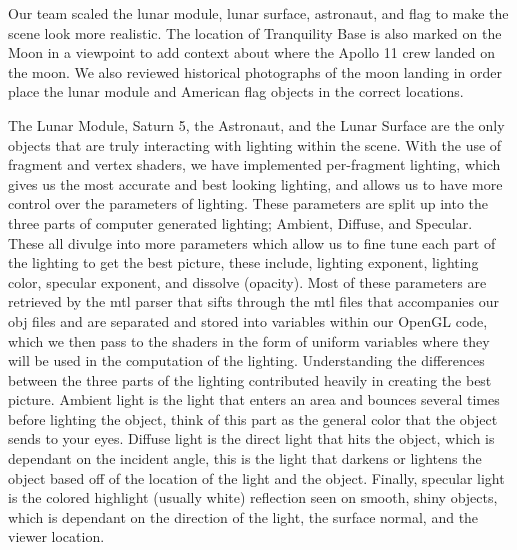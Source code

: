\documentclass[onecolumn, draftclsnofoot,10pt, compsoc]{IEEEtran}
\begin{document}
Our team scaled the lunar module, lunar surface, astronaut, and flag to make the scene look more realistic. The location of Tranquility Base is also marked on the Moon in a viewpoint to add context about where the Apollo 11 crew landed on the moon. We also reviewed historical photographs of the moon landing in order place the lunar module and American flag objects in the correct locations.

The Lunar Module, Saturn 5, the Astronaut, and the Lunar Surface are the only objects that are truly interacting with lighting within the scene. With the use of fragment and vertex shaders, we have implemented per-fragment lighting, which gives us the most accurate and best looking lighting, and allows us to have more control over the parameters of lighting. These parameters are split up into the three parts of computer generated lighting; Ambient, Diffuse, and Specular. These all divulge into more parameters which allow us to fine tune each part of the lighting to get the best picture, these include, lighting exponent, lighting color, specular exponent, and dissolve (opacity). Most of these parameters are retrieved by the mtl parser that sifts through the mtl files that accompanies our obj files and are separated and stored into variables within our OpenGL code, which we then pass to the shaders in the form of uniform variables where they will be used in the computation of the lighting. Understanding the differences between the three parts of the lighting contributed heavily in creating the best picture. Ambient light is the light that enters an area and bounces several times before lighting the object, think of this part as the general color that the object sends to your eyes. Diffuse light is the direct light that hits the object, which is dependant on the incident angle, this is the light that darkens or lightens the object based off of the location of the light and the object. Finally, specular light is the colored highlight (usually white) reflection seen on smooth, shiny objects, which is dependant on the direction of the light, the surface normal, and the viewer location. 
\end{document}
